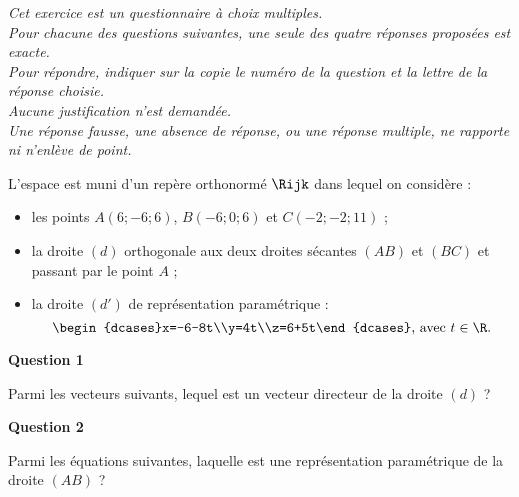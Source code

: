 \emph{Cet exercice est un questionnaire à choix multiples.\\ Pour chacune des questions suivantes, une seule des quatre réponses proposées est exacte.\\ Pour répondre, indiquer sur la copie le numéro de la question et la lettre de la réponse choisie.\\ Aucune justification n'est demandée.\\ Une réponse fausse, une absence de réponse, ou une réponse multiple, ne rapporte ni n'enlève de point.}

\medskip

L'espace est muni d'un repère orthonormé $\Rijk$ dans lequel on considère :

\begin{itemize}
	\item les points $A(6;-6;6)$, $B(-6;0;6)$ et $C(-2;-2;11)$ ;
	\item la droite $(d)$ orthogonale aux deux droites sécantes $(AB)$ et $(BC)$ et passant par le point $A$ ;
	\item la droite $(d')$ de représentation paramétrique : \[ \begin{dcases}x=-6-8t\\y=4t\\z=6+5t\end{dcases}\text{, avec } t \in \R.\]
\end{itemize}

\medskip

\textbf{Question 1}

\medskip

Parmi les vecteurs suivants, lequel est un vecteur directeur de la droite $(d)$ ?

\smallskip


\medskip

\textbf{Question 2}

\medskip

Parmi les équations suivantes, laquelle est une représentation paramétrique de la droite
$(AB)$ ?

\smallskip

